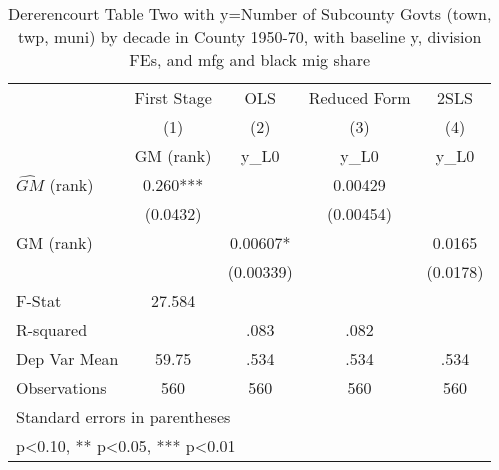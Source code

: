 \begin{table}[htbp]\centering
\def\sym#1{\ifmmode^{#1}\else\(^{#1}\)\fi}
\caption{Dererencourt Table Two with y=Number of Subcounty Govts (town, twp, muni) by decade in County 1950-70, with baseline y, division FEs, and mfg and black mig share}
\begin{tabular}{l*{4}{c}}
\toprule
                    & First Stage   &         OLS   &Reduced Form   &        2SLS   \\
                    &\multicolumn{1}{c}{(1)}&\multicolumn{1}{c}{(2)}&\multicolumn{1}{c}{(3)}&\multicolumn{1}{c}{(4)}\\
                    &\multicolumn{1}{c}{GM  (rank)}&\multicolumn{1}{c}{y\_L0}&\multicolumn{1}{c}{y\_L0}&\multicolumn{1}{c}{y\_L0}\\
\midrule
$\hat{GM}$ (rank)   &       0.260***&               &     0.00429   &               \\
                    &    (0.0432)   &               &   (0.00454)   &               \\
\addlinespace
GM  (rank)          &               &     0.00607*  &               &      0.0165   \\
                    &               &   (0.00339)   &               &    (0.0178)   \\
\midrule
F-Stat              &      27.584   &               &               &               \\
R-squared           &               &        .083   &        .082   &               \\
Dep Var Mean        &       59.75   &        .534   &        .534   &        .534   \\
Observations        &         560   &         560   &         560   &         560   \\
\bottomrule
\multicolumn{5}{l}{\footnotesize Standard errors in parentheses}\\
\multicolumn{5}{l}{\footnotesize * p<0.10, ** p<0.05, *** p<0.01}\\
\end{tabular}
\end{table}
